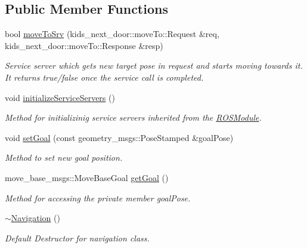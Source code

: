 \subsection*{Public Member Functions}
\begin{DoxyCompactItemize}
\item 
bool \hyperlink{classNavigation_a31e234539cce5f116f23019246c01ff8}{move\+To\+Srv} (kids\+\_\+next\+\_\+door\+::move\+To\+::\+Request \&req, kids\+\_\+next\+\_\+door\+::move\+To\+::\+Response \&resp)
\begin{DoxyCompactList}\small\item\em Service server which gets new target pose in request and starts moving towards it. It returns true/false once the service call is completed. \end{DoxyCompactList}\item 
void \hyperlink{classNavigation_a6d6f40c4ccb483aea94d276907767dba}{initialize\+Service\+Servers} ()
\begin{DoxyCompactList}\small\item\em Method for initializinig service servers inherited from the \hyperlink{classROSModule}{R\+O\+S\+Module}. \end{DoxyCompactList}\item 
void \hyperlink{classNavigation_a94004249498512cba4b86a0933823584}{set\+Goal} (const geometry\+\_\+msgs\+::\+Pose\+Stamped \&goal\+Pose)
\begin{DoxyCompactList}\small\item\em Method to set new goal position. \end{DoxyCompactList}\item 
move\+\_\+base\+\_\+msgs\+::\+Move\+Base\+Goal \hyperlink{classNavigation_a03d605fee146a452bb91f9e6ae1af1b3}{get\+Goal} ()
\begin{DoxyCompactList}\small\item\em Method for accessing the private member goal\+Pose. \end{DoxyCompactList}\item 
\hyperlink{classNavigation_addd4022d716df48f4e55a1db69361ba7}{$\sim$\+Navigation} ()\hypertarget{classNavigation_addd4022d716df48f4e55a1db69361ba7}{}\label{classNavigation_addd4022d716df48f4e55a1db69361ba7}

\begin{DoxyCompactList}\small\item\em Default Destructor for navigation class. \end{DoxyCompactList}\end{DoxyCompactItemize}


